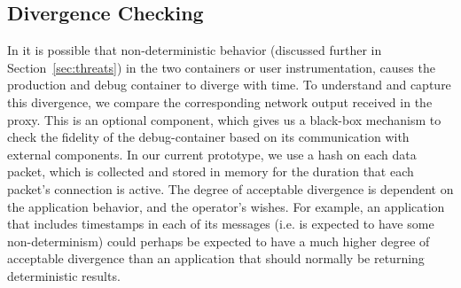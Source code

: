 
\subsection{Divergence Checking}
\label{sec:divergenceChecking}

In \parikshan it is possible that non-deterministic behavior (discussed further in Section~\ref{sec:threats}) in the two containers or user instrumentation, causes the production and debug container to diverge with time.
To understand and capture this divergence, we compare the corresponding network output received in the proxy.
This is an optional component, which gives us a black-box mechanism to check the fidelity of the debug-container based on its communication with external components.
In our current prototype, we use a hash on each data packet, which is collected and stored in memory for the duration that each packet's connection is active.
The degree of acceptable divergence is dependent on the application behavior, and the operator's wishes. 
For example, an application that includes timestamps in each of its messages (i.e. is expected to have some non-determinism) could perhaps be expected to have a much higher degree of acceptable divergence than an application that should normally be returning deterministic results.
